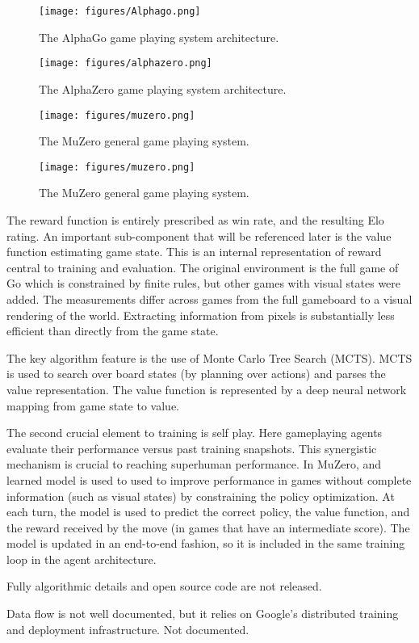 \documentclass[12pt, a4paper, twocolumn]{article}
\begin{document}
\begin{figure}[t]
    \texttt{[image: figures/Alphago.png]}
    \caption{%
        The AlphaGo game playing system architecture.
    }
\end{figure}

\begin{figure}[t]
    \texttt{[image: figures/alphazero.png]}
    \caption{%
        The AlphaZero game playing system architecture.
    }
\end{figure}

\begin{figure}[t]
    \texttt{[image: figures/muzero.png]}
    \caption{%
        The MuZero general game playing system.
    }
\end{figure}

\begin{figure}[t]
    \texttt{[image: figures/muzero.png]}
    \caption{%
        The MuZero general game playing system.
    }
\end{figure}
\Implementation
{The reward function is entirely prescribed as win rate, and the resulting Elo rating.
An important sub-component that will be referenced later is the value function estimating game state. 
This is an internal representation of reward central to training and evaluation. }
{The original environment is the full game of Go which is constrained by finite rules, but other games with visual states were added.}
{The measurements differ across games from the full gameboard to a visual rendering of the world. 
Extracting information from pixels is substantially less efficient than directly from the game state.}
{The key algorithm feature is the use of Monte Carlo Tree Search (MCTS). 
MCTS is used to search over board states (by planning over actions) and parses the value representation.
The value function is represented by a deep neural network mapping from game state to value.

The second crucial element to training is self play. 
Here gameplaying agents evaluate their performance versus past training snapshots.
This synergistic mechanism is crucial to reaching superhuman performance.
In MuZero, and learned model is used to used to improve performance in games without complete information (such as visual states) by constraining the policy optimization.
At each turn, the model is used to predict the correct policy, the value function, and the reward received by the move (in games that have an intermediate score).
The model is updated in an end-to-end fashion, so it is included in the same training loop in the agent architecture.

Fully algorithmic details and open source code are not released.}
{Data flow is not well documented, but it relies on Google's distributed training and deployment infrastructure.}
{}
{Not documented.}
\end{document}
